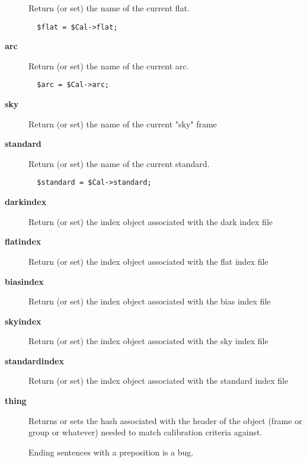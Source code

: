 \begin{description}
Return (or set) the name of the current flat.

\begin{verbatim}
  $flat = $Cal->flat;
\end{verbatim}
\item[\textbf{arc}] \mbox{}

Return (or set) the name of the current arc.

\begin{verbatim}
  $arc = $Cal->arc;
\end{verbatim}
\item[\textbf{sky}] \mbox{}

Return (or set) the name of the current "sky" frame

\item[\textbf{standard}] \mbox{}

Return (or set) the name of the current standard.

\begin{verbatim}
  $standard = $Cal->standard;
\end{verbatim}
\item[\textbf{darkindex}] \mbox{}

Return (or set) the index object associated with the dark index file

\item[\textbf{flatindex}] \mbox{}

Return (or set) the index object associated with the flat index file

\item[\textbf{biasindex}] \mbox{}

Return (or set) the index object associated with the bias index file

\item[\textbf{skyindex}] \mbox{}

Return (or set) the index object associated with the sky index file

\item[\textbf{standardindex}] \mbox{}

Return (or set) the index object associated with the standard index file

\item[\textbf{thing}] \mbox{}

Returns or sets the hash associated with the header of the object
(frame or group or whatever) needed to match calibration criteria
against.

Ending sentences with a preposition is a bug.

\end{description}


